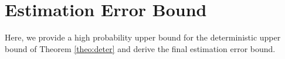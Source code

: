 \section{Estimation Error Bound}
\label{sec:error}
Here, we provide a high probability upper bound for the deterministic upper bound of Theorem \ref{theo:deter} and derive the final estimation error bound.


